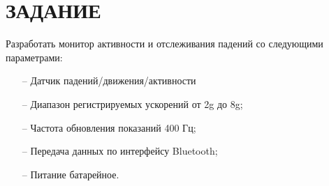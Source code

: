 \begin{sloppypar} %
\newpage %
\section*{ЗАДАНИЕ} %

Разработать монитор активности и отслеживания падений  со следующими параметрами: 
\begin{itemize}
	\item[--]Датчик падений/движения/активности
	\item[--]Диапазон регистрируемых ускорений от 2g до 8g;
	\item[--]Частота обновления показаний 400 Гц;
	\item[--]Передача данных по интерфейсу Bluetooth;
	\item[--]Питание батарейное.
\end{itemize}
\end{sloppypar}